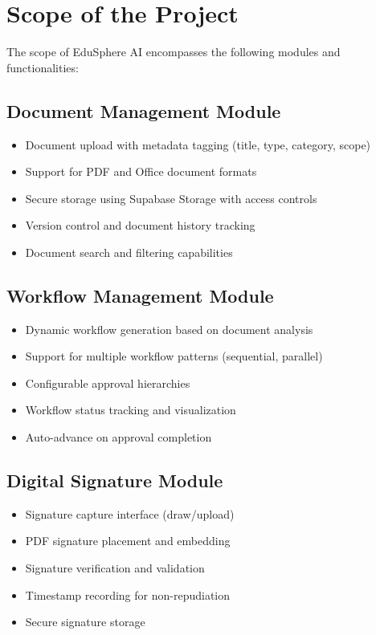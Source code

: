\section{Scope of the Project}

The scope of EduSphere AI encompasses the following modules and functionalities:

\subsection{Document Management Module}
\begin{itemize}[itemsep=3pt]
\item Document upload with metadata tagging (title, type, category, scope)
\item Support for PDF and Office document formats
\item Secure storage using Supabase Storage with access controls
\item Version control and document history tracking
\item Document search and filtering capabilities
\end{itemize}

\subsection{Workflow Management Module}
\begin{itemize}[itemsep=3pt]
\item Dynamic workflow generation based on document analysis
\item Support for multiple workflow patterns (sequential, parallel)
\item Configurable approval hierarchies
\item Workflow status tracking and visualization
\item Auto-advance on approval completion
\end{itemize}

\subsection{Digital Signature Module}
\begin{itemize}[itemsep=3pt]
\item Signature capture interface (draw/upload)
\item PDF signature placement and embedding
\item Signature verification and validation
\item Timestamp recording for non-repudiation
\item Secure signature storage
\end{itemize}

